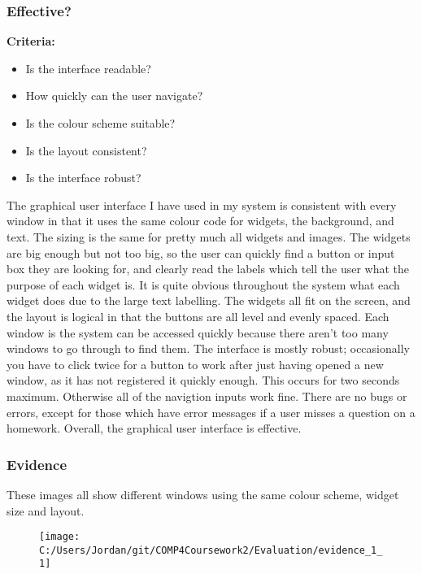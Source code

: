 \subsubsection{Effective?}

\textbf{Criteria: }

\begin{itemize}
	\item Is the interface readable?
	\item How quickly can the user navigate?
	\item Is the colour scheme suitable?
	\item Is the layout consistent?
	\item Is the interface robust?
\end{itemize}

The graphical user interface I have used in my system is consistent with every window in that it uses the same colour code for widgets, the background, and text. The sizing is the same for pretty much all widgets and images. The widgets are big enough but not too big, so the user can quickly find a button or input box they are looking for, and clearly read the labels which tell the user what the purpose of each widget is. It is quite obvious throughout the system what each widget does due to the large text labelling. The widgets all fit on the screen, and the layout is logical in that the buttons are all level and evenly spaced. Each window is the system can be accessed quickly because there aren't too many windows to go through to find them. The interface is mostly robust; occasionally you have to click twice for a button to work after just having opened a new window, as it has not registered it quickly enough. This occurs for two seconds maximum. Otherwise all of the navigtion inputs work fine. There are no bugs or errors, except for those which have error messages if a user misses a question on a homework. Overall, the graphical user interface is effective.

\subsubsection{Evidence}

These images all show different windows using the same colour scheme, widget size and layout.

\begin{figure}[H]
	\texttt{[image: C:/Users/Jordan/git/COMP4Coursework2/Evaluation/evidence\_1\_1]}
\end{figure}

